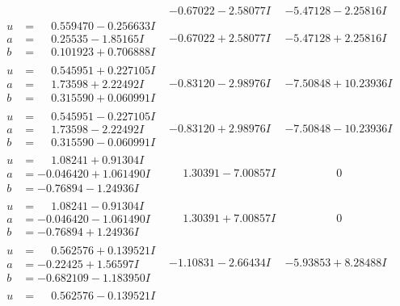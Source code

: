 \documentclass[1p]{elsarticle_modified}
\theoremstyle{definition}
\begin{document}
$$\begin{array}{c|c|c}
 & -0.67022 - 2.58077 I & -5.47128 - 2.25816 I \\ \hline\begin{aligned}
u &= \phantom{-}0.559470 - 0.256633 I \\
a &= \phantom{-}0.25535 - 1.85165 I \\
b &= \phantom{-}0.101923 + 0.706888 I\end{aligned}
 & -0.67022 + 2.58077 I & -5.47128 + 2.25816 I \\ \hline\begin{aligned}
u &= \phantom{-}0.545951 + 0.227105 I \\
a &= \phantom{-}1.73598 + 2.22492 I \\
b &= \phantom{-}0.315590 + 0.060991 I\end{aligned}
 & -0.83120 - 2.98976 I & -7.50848 + 10.23936 I \\ \hline\begin{aligned}
u &= \phantom{-}0.545951 - 0.227105 I \\
a &= \phantom{-}1.73598 - 2.22492 I \\
b &= \phantom{-}0.315590 - 0.060991 I\end{aligned}
 & -0.83120 + 2.98976 I & -7.50848 - 10.23936 I \\ \hline\begin{aligned}
u &= \phantom{-}1.08241 + 0.91304 I \\
a &= -0.046420 + 1.061490 I \\
b &= -0.76894 - 1.24936 I\end{aligned}
 & \phantom{-}1.30391 - 7.00857 I & \phantom{-0.000000 } 0 \\ \hline\begin{aligned}
u &= \phantom{-}1.08241 - 0.91304 I \\
a &= -0.046420 - 1.061490 I \\
b &= -0.76894 + 1.24936 I\end{aligned}
 & \phantom{-}1.30391 + 7.00857 I & \phantom{-0.000000 } 0 \\ \hline\begin{aligned}
u &= \phantom{-}0.562576 + 0.139521 I \\
a &= -0.22425 + 1.56597 I \\
b &= -0.682109 - 1.183950 I\end{aligned}
 & -1.10831 - 2.66434 I & -5.93853 + 8.28488 I \\ \hline\begin{aligned}
u &= \phantom{-}0.562576 - 0.139521 I \\

\end{aligned}
\end{array}$$
\end{document}
